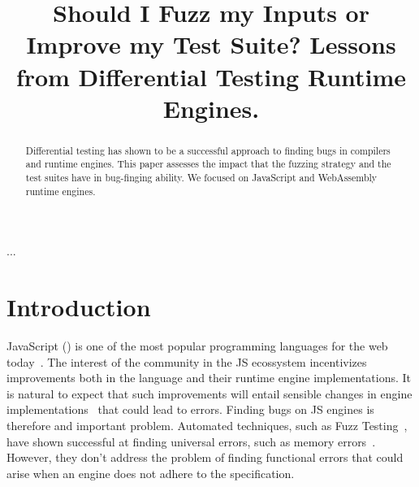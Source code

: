 \documentclass[10pt,conference,anonymous]{IEEEtran}
\begin{document}
\title{Should I Fuzz my Inputs or Improve my Test Suite? Lessons from
  Differential Testing Runtime Engines.}


\maketitle

\begin{abstract}
Differential testing has shown to be a successful approach to finding
bugs in compilers and runtime engines. This paper assesses the impact
that the fuzzing strategy and the test suites have in bug-finging
ability. We focused on JavaScript and WebAssembly runtime
engines. 
\end{abstract}

\begin{IEEEkeywords}
...
\end{IEEEkeywords}

\section{Introduction}

JavaScript (\js{}) is one of the most popular programming languages
for the web today~\cite{business-insider,stackify}. The interest of
the community in the JS ecossystem incentivizes improvements both in
the language and their runtime engine implementations. It is natural
to expect that such improvements will entail sensible changes in
engine implementations~\cite{kangax} that could lead to
errors. Finding bugs on JS engines is therefore and important
problem. Automated techniques, such as Fuzz Testing~\cite{fuzz-bart},
have shown successful at finding universal errors, such as memory
errors~\cite{libfuzzer-tutorial}. However, they don't address the
problem of finding functional errors that could arise when an engine
does not adhere to the specification.
\end{document}
